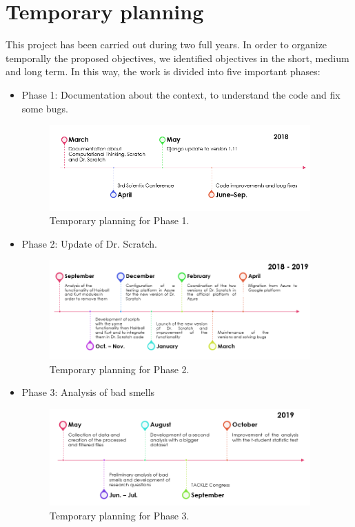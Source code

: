\section{Temporary planning}
\label{sec:temporary-planning}

This project has been carried out during two full years. In order to organize temporally the proposed objectives, we identified objectives in the short, medium and long term. In this way, the work is divided into five important phases:

\begin{itemize}
    \item Phase 1: Documentation about the context, to understand the code and fix some bugs.
    
    \begin{figure}[h]
    \centering
        \includegraphics[width=10cm, keepaspectratio]{img/phase_1.png}
        \caption{Temporary planning for Phase 1.}
        \label{fig:phase_1}
    \end{figure}

    \item Phase 2: Update of Dr. Scratch.
    
    \begin{figure}[h]
    \centering
        \includegraphics[width=10cm, keepaspectratio]{img/phase_2.png}
        \caption{Temporary planning for Phase 2.}
        \label{fig:phase_2}
    \end{figure}
    
    \item Phase 3: Analysis of bad smells
    
    \begin{figure}[h]
    \centering
        \includegraphics[width=10cm, keepaspectratio]{img/phase_3.png}
        \caption{Temporary planning for Phase 3.}
        \label{fig:phase_3}
    \end{figure}
    

\end{itemize}
